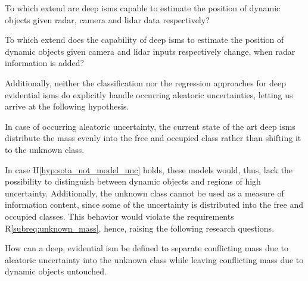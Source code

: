 \begin{requ} \label{requ:dyn_objects}
	To which extend are deep \gls{ism}s capable to estimate the position of dynamic objects given radar, camera and lidar data respectively?
\end{requ}
\begin{requ} \label{requ:dyn_objects_with_radar}
	To which extend does the capability of deep \gls{ism}s to estimate the position of dynamic objects given camera and lidar inputs respectively change, when radar information is added? 
\end{requ}
Additionally, neither the classification nor the regression approaches for deep evidential \gls{ism}s do explicitly handle occurring aleatoric uncertainties, letting us arrive at the following hypothesis.
\\
\begin{hyp} \label{hyp:sota_not_model_unc}
	In case of occurring aleatoric uncertainty, the current state of the art deep \gls{ism}s distribute the mass evenly into the free and occupied class rather than shifting it to the unknown class. 
\end{hyp}
In case H\ref{hyp:sota_not_model_unc} holds, these models would, thus, lack the possibility to distinguish between dynamic objects and regions of high uncertainty. Additionally, the unknown class cannot be used as a measure of information content, since some of the uncertainty is distributed into the free and occupied classes. This behavior would violate the requirements R\ref{subreq:unknown_mass}, hence, raising the following research questions. 
\\
\begin{requ} \label{requ:how_to_sep_uncertainty}
	How can a deep, evidential \gls{ism} be defined to separate conflicting mass due to aleatoric uncertainty into the unknown class while leaving conflicting mass due to dynamic objects untouched. 
\end{requ}
%
